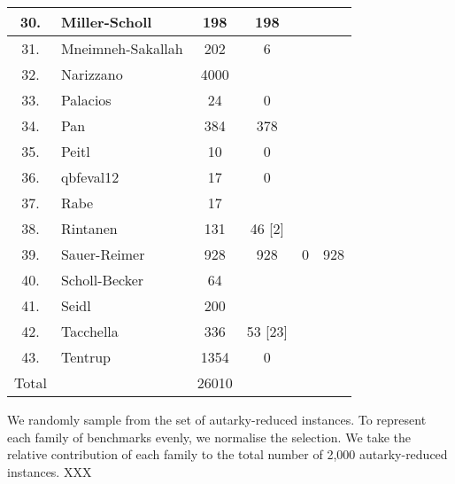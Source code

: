 \documentclass[runningheads]{llncs}
\begin{document}
\begin{table}
\begin{tabular}{c|l|c|c|c|c}
30. & Miller-Scholl & 198 & 198 &  &  \\ \hline

31. & Mneimneh-Sakallah &  202 & 6 &  &  \\ \hline

32. & Narizzano &  4000 & &  &  \\ \hline 

33. & Palacios & 24 & 0 &  &  \\ \hline

34. & Pan &  384 & 378 &  &  \\ \hline

35. & Peitl & 10 & 0 &  &  \\\hline

36. & qbfeval12 & 17 & 0 &  &  \\ \hline

37. & Rabe &  17 &  &   \\ \hline

38. & Rintanen &  131 & 46 [2] &  &  \\\hline

39. & Sauer-Reimer &  928 & 928 & 0 & 928 \\ \hline

40. & Scholl-Becker & 64 &  &  &  \\ \hline

41. & Seidl &  200 &  &  &  \\ \hline

42. & Tacchella &  336 & 53 [23] &  &  \\ \hline 

43. & Tentrup & 1354 & 0  &  &  \\ \hline \hline

Total &  & 26010 &  &  &  \\  \hline \hline
 

\hline
\end{tabular}
\end{table}


We randomly sample from the set of autarky-reduced instances. To represent each family of benchmarks evenly, we normalise the selection. We take the relative contribution of each family to the total number of 2,000 autarky-reduced instances. XXX
\end{document}
